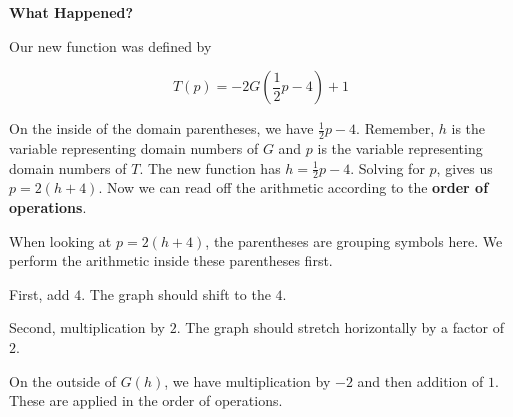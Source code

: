 \documentclass{ximera}
\begin{document}
\begin{example}
\begin{image}
\end{image}






\textbf{What Happened?} 

Our new function was defined by 

\[
T(p) = -2G\left( \frac{1}{2} p - 4 \right) + 1
\]






On the inside of the domain parentheses, we have $\frac{1}{2} p - 4$.  Remember, $h$ is the variable representing domain numbers of $G$ and $p$ is the variable representing domain numbers of $T$. The new function has $h = \frac{1}{2} p - 4$. Solving for $p$, gives us $p = 2(h+4)$.  Now we can read off the arithmetic according to the \textbf{order of operations}.  




When looking at $p = 2(h+4)$, the parentheses are grouping symbols here.  We perform the arithmetic inside these parentheses first. 

First, add $4$. The graph should shift to the  $4$. 

Second, multiplication by $2$. The graph should stretch horizontally by a factor of $2$.




On the outside of $G(h)$, we have multiplication by $-2$ and then addition of $1$.  These are applied in the order of operations. 


\end{example}
\end{document}
